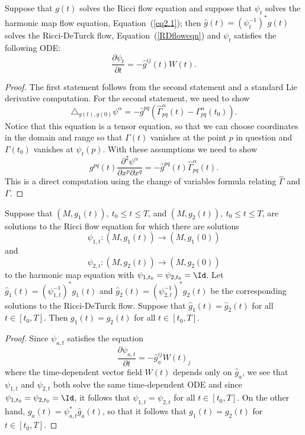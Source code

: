 \begin{lemma}
\label{lem:harmonic-map-flow-ricci-deturck}
\label{12.7}
Suppose that $g(t)$ solves the Ricci flow equation and suppose that
$\psi_t$ solves the harmonic map flow equation,
Equation~(\ref{eq2.1}); then $\hat g(t)=(\psi_t^{-1})^*g(t)$ solves
the Ricci-DeTurck flow, Equation~(\ref{RDfloweqn}) and $\psi_t$
satisfies the following ODE:
$$\frac{\partial \psi_t}{\partial t}=-\hat g^{ij}(t)W(t).$$
\end{lemma}

\begin{proof}
The first statement follows from the second statement and a standard
Lie derivative computation. For the second statement, we need to
show
$$\triangle_{g(t),g(0)} \psi^\alpha = -\hat
g^{pq}\left(\hat\Gamma_{pq}^\alpha(t)-\Gamma_{pq}^\alpha(t_0)\right).$$
Notice that this equation is a tensor equation, so that we can
choose coordinates in the domain and range so that $\Gamma(t)$
vanishes at the point $p$ in question and $\Gamma(t_0)$ vanishes at
$\psi_t(p)$.  With these assumptions we need to show
$$g^{pq}(t)\frac{\partial^2 \psi^\alpha}{\partial x^p\partial x^q}=-\hat g^{pq}(t)\hat\Gamma_{pq}^\alpha(t).$$
This is a direct computation using the change of variables formula
relating $\hat \Gamma$ and $\Gamma$.
\end{proof}

\begin{corollary}
\label{cor:ricci-deturck-uniqueness-implies-ricci-uniqueness}
\label{dtuniqtouniq}
Suppose that $(M,g_1(t)),\ t_0\le t\le T$, and $(M,g_2(t)),\ t_0\le
t\le T$, are solutions to the Ricci flow equation for which there
are solutions
$$\psi_{1,t}\colon (M,g_1(t))\to (M,g_1(0))$$ and
$$\psi_{2,t}\colon
(M,g_2(t))\to (M,g_2(0))$$ to the harmonic map equation with
$\psi_{1,t_0}=\psi_{2,t_0}=\Id$. Let $\hat
g_1(t)=(\psi_{1,t}^{-1})^*g_1(t)$ and $\hat
g_2(t)=(\psi_{2,t}^{-1})^*g_2(t)$ be the corresponding solutions to
the Ricci-DeTurck flow. Suppose that $\hat g_1(t)=\hat g_2(t)$ for
all $t\in [t_0,T]$. Then $g_1(t)=g_2(t)$ for all $t\in [t_0,T]$.
\end{corollary}

\begin{proof}
Since $\psi_{a,t}$ satisfies the equation
$$\frac{\partial \psi_{a,t}}{\partial t}=-\hat g_a^{ij}W(t)_j$$
where the time-dependent vector field $W(t)$ depends only on $\hat
g_a$, we see that $\psi_{1,t}$ and $\psi_{2,t}$ both solve the same
time-dependent ODE and since $\psi_{1,t_0}=\psi_{2,t_0}=\Id$,
it follows that $\psi_{1,t}=\psi_{2,t}$ for all $t\in [t_0,T]$. On
the other hand, $g_a(t)=\psi_{a,t}^*\hat g_a(t)$, so that it follows
that $g_1(t)=g_2(t)$ for $t\in [t_0,T]$.
\end{proof}



